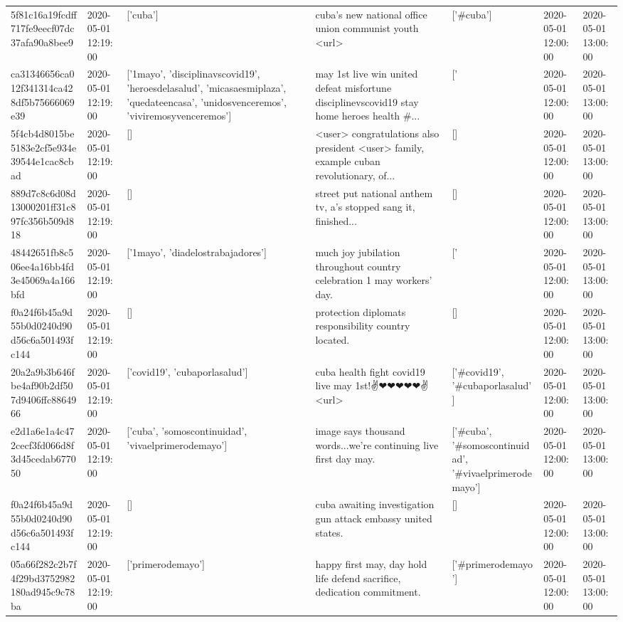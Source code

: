 \begin{tabular}{lllllll}
5f81c16a19fcdff717fe9eecf07dc37afa90a8bee9 & 2020-05-01 12:19:00 & ['cuba'] & cuba's new national office union communist youth <url> & ['#cuba'] & 2020-05-01 12:00:00 & 2020-05-01 13:00:00 \\
ca31346656ca012f341314ca428df5b75666069e39 & 2020-05-01 12:19:00 & ['1mayo', 'disciplinavscovid19', 'heroesdelasalud', 'micasaesmiplaza', 'quedateencasa', 'unidosvenceremos', 'viviremosyvenceremos'] & may 1st live win united defeat misfortune disciplinevscovid19 stay home heroes health \#... & ['#1mayo', '#heroesdelasalud', '#micasaesmiplaza', '#quedateencasa', '#unidosvenceremos', '#viviremosyvenceremos'] & 2020-05-01 12:00:00 & 2020-05-01 13:00:00 \\
5f4cb4d8015be5183e2cf5e934e39544e1cac8cbad & 2020-05-01 12:19:00 & [] & <user> congratulations also president <user> family, example cuban revolutionary, of... & [] & 2020-05-01 12:00:00 & 2020-05-01 13:00:00 \\
889d7c8c6d08d13000201ff31c897fc356b509d818 & 2020-05-01 12:19:00 & [] & street put national anthem tv, a's stopped sang it, finished... & [] & 2020-05-01 12:00:00 & 2020-05-01 13:00:00 \\
48442651fb8c506ee4a16bb4fd3e45069a4a166bfd & 2020-05-01 12:19:00 & ['1mayo', 'diadelostrabajadores'] & much joy jubilation throughout country celebration 1 may workers' day. & ['#1mayo', '#diadelostrabajadores'] & 2020-05-01 12:00:00 & 2020-05-01 13:00:00 \\
f0a24f6b45a9d55b0d0240d90d56c6a501493fc144 & 2020-05-01 12:19:00 & [] & protection diplomats responsibility country located. & [] & 2020-05-01 12:00:00 & 2020-05-01 13:00:00 \\
20a2a9b3b646fbe4af90b2df507d9406ffc8864966 & 2020-05-01 12:19:00 & ['covid19', 'cubaporlasalud'] & cuba health fight covid19 live may 1st!✌❤❤❤❤❤✌ <url> & ['#covid19', '#cubaporlasalud'] & 2020-05-01 12:00:00 & 2020-05-01 13:00:00 \\
e2d1a6e1a4c472cecf3fd066d8f3d45cedab677050 & 2020-05-01 12:19:00 & ['cuba', 'somoscontinuidad', 'vivaelprimerodemayo'] & image says thousand words...we're continuing live first day may. & ['#cuba', '#somoscontinuidad', '#vivaelprimerodemayo'] & 2020-05-01 12:00:00 & 2020-05-01 13:00:00 \\
f0a24f6b45a9d55b0d0240d90d56c6a501493fc144 & 2020-05-01 12:19:00 & [] & cuba awaiting investigation gun attack embassy united states. & [] & 2020-05-01 12:00:00 & 2020-05-01 13:00:00 \\
05a66f282c2b7f4f29bd3752982180ad945c9c78ba & 2020-05-01 12:19:00 & ['primerodemayo'] & happy first may, day hold life defend sacrifice, dedication commitment. & ['#primerodemayo'] & 2020-05-01 12:00:00 & 2020-05-01 13:00:00 \\

\end{tabular}
